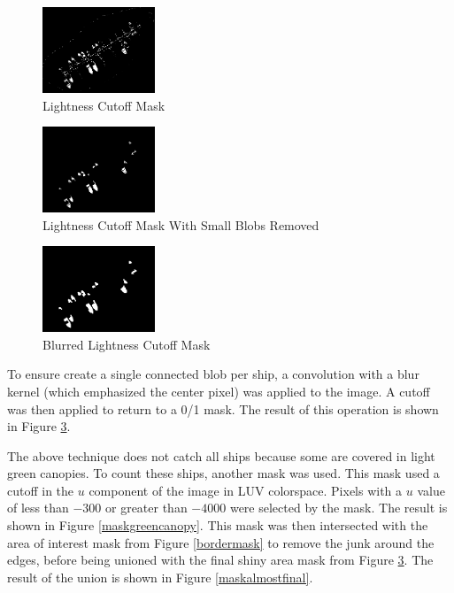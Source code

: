 \documentclass[12pt]{article}
\begin{document}
\begin{figure}
\centering
\includegraphics[width=0.30\textwidth]{mask_shiny.png}
\caption{Lightness Cutoff Mask}
\label{maskshiny}
\end{figure}

\begin{figure}
\centering
\includegraphics[width=0.30\textwidth]{mask_shiny_minus_blobs.png}
\caption{Lightness Cutoff Mask With Small Blobs Removed}
\label{maskshinyminusblobs}
\end{figure}

\begin{figure}
\centering
\includegraphics[width=0.30\textwidth]{mask_shiny_minus_blobs_blurred.png}
\caption{Blurred Lightness Cutoff Mask}
\label{maskshinyminusblobsblurred}
\end{figure}

To ensure create a single connected blob per ship, a convolution with a blur kernel (which emphasized the center pixel) was applied to the image. A cutoff was then applied to return to a 0/1 mask. The result of this operation is shown in Figure \ref{maskshinyminusblobsblurred}.

The above technique does not catch all ships because some are covered in light green canopies. To count these ships, another mask was used. This mask used a cutoff in the \(u\) component of the image in LUV colorspace. Pixels with a \(u\) value of less than \(-300\) or greater than \(-4000\) were selected by the mask. The result is shown in Figure \ref{maskgreencanopy}. This mask was then intersected with the area of interest mask from Figure \ref{bordermask} to remove the junk around the edges, before being unioned with the final shiny area mask from Figure \ref{maskshinyminusblobsblurred}. The result of the union is shown in Figure \ref{maskalmostfinal}.
\end{document}
